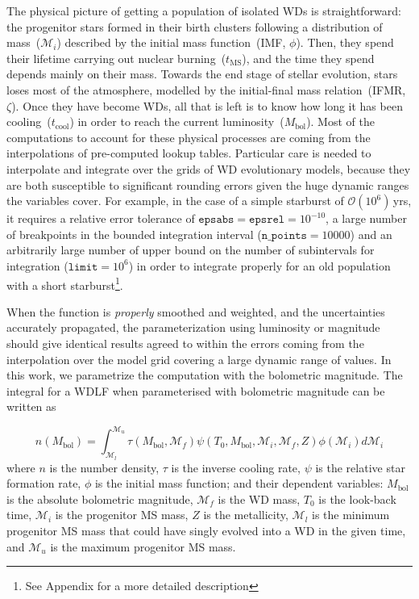 \documentclass[fleqn,usenatbib]{mnras}
\begin{document}
The physical picture of getting a population of isolated WDs is
straightforward: the progenitor stars formed in their birth clusters
following a distribution of mass~($\mathcal{M}_i$) described by the initial
mass function~(IMF, $\phi$). Then, they spend their lifetime carrying out
nuclear burning~($t_{\mathrm{MS}}$), and the time they spend depends mainly
on their mass. Towards the end stage of stellar evolution, stars loses most
of the atmosphere, modelled by the initial-final mass relation~(IFMR,
$\zeta$). Once they have become WDs, all that is left is to know how long it
has been cooling~($t_{\mathrm{cool}}$) in order to reach the current
luminosity~($M_\mathrm{bol}$). Most of the computations to account for these
physical processes are coming from the interpolations of pre-computed lookup
tables. Particular care is needed to interpolate and integrate over the
grids of WD evolutionary models, because they are both susceptible to
significant rounding errors given the huge dynamic ranges the variables cover.
For example, in the case of a simple starburst of $\mathcal{O}(10^6)$\,yrs, it
requires a relative error tolerance of
$\texttt{epsabs} = \texttt{epsrel} = 10^{-10}$, a large number of breakpoints
in the bounded integration interval ($\texttt{n\_points} = 10000$) and an 
arbitrarily large number of upper bound on the number of subintervals for
integration ($\texttt{limit} = 10^{6}$) in order to integrate properly for an
old population with a short starburst\footnote{See Appendix for a more detailed
description}.

When the function is \textit{properly} smoothed and weighted, and the
uncertainties accurately propagated, the parameterization using luminosity or
magnitude should give identical results agreed to within the errors coming from
the interpolation over the model grid covering a large dynamic range of values.
In this work, we parametrize the computation with the bolometric magnitude. The
integral for a WDLF when parameterised with bolometric magnitude can be written
as

\begin{equation} \label{eqn:wdlf}
    n(M_{\mathrm{bol}}) = \int_{\mathcal{M}_l}^{\mathcal{M}_u}
        \tau(M_\mathrm{bol}, \mathcal{M}_f)
        \psi(T_0, M_\mathrm{bol}, \mathcal{M}_i, \mathcal{M}_f, Z)
        \phi(\mathcal{M}_i) d\mathcal{M}_i
\end{equation}
where $n$ is the number density, $\tau$ is the inverse cooling rate, $\psi$ is
the relative star formation rate, $\phi$ is the initial mass function; and their
dependent variables: $M_\mathrm{bol}$ is the absolute bolometric
magnitude, $\mathcal{M}_f$ is the WD mass, $T_0$ is the look-back time, $\mathcal{M}_i$ is
the progenitor MS mass, $Z$ is the metallicity, $\mathcal{M}_l$ is the minimum
progenitor MS mass that could have singly evolved into a WD in the given time,
and $\mathcal{M}_u$ is the maximum progenitor MS mass.
\end{document}

